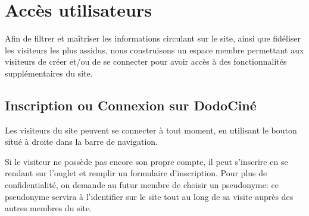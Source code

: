 \chapter{Accès utilisateurs}

    Afin de filtrer et maîtriser les informations circulant sur le site, ainsi que fidéliser les visiteurs les plus assidus, nous construisons un espace membre permettant aux visiteurs de créer et/ou de se connecter pour avoir accès à des fonctionnalités supplémentaires du site.

    \section{Inscription ou Connexion sur DodoCiné}

        Les visiteurs du site peuvent se connecter à tout moment, en utilisant le bouton  situé à droite dans la barre de navigation. 



        \medskip
        Si le visiteur ne possède pas encore son propre compte, il peut s'inscrire en se rendant sur l'onglet  et remplir un formulaire d'inscription. Pour plus de confidentialité, on demande au futur membre de choisir un pseudonyme: ce pseudonyme servira à l'identifier sur le site tout au long de sa visite auprès des autres membres du site.

        \bigskip

